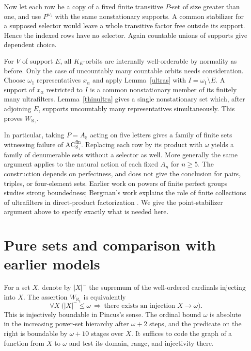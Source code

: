 \documentclass[11pt]{article}
\begin{document}
Now let each row be a copy of a fixed finite transitive $P$-set of size greater than one, and use $P^{\omega_1}$ with the same nonstationary supports. A common stabilizer for a supposed selector would leave a whole transitive factor free outside its support. Hence the indexed rows have no selector. Again countable unions of supports give dependent choice.

For $V$ of support $E$, all $K_E$-orbits are internally well-orderable by normality as before. Only the case of uncountably many countable orbits needs consideration. Choose $\omega_1$ representatives $x_\alpha$ and apply Lemma~\ref{ultras} with $I=\omega_1\setminus E$. A support of $x_\alpha$ restricted to $I$ is a common nonstationary member of its finitely many ultrafilters. Lemma~\ref{thinultra} gives a single nonstationary set which, after adjoining $E$, supports uncountably many representatives simultaneously. This proves $W_{\aleph_1}$.

In particular, taking $P=A_5$ acting on five letters gives a family of finite sets witnessing failure of $\mathrm{AC}_{\aleph_1}^{\mathrm{fin}}$. Replacing each row by its product with $\omega$ yields a family of denumerable sets without a selector as well. More generally the same argument applies to the natural action of each fixed $A_n$ for $n\ge5$. The construction depends on perfectness, and does not give the conclusion for pairs, triples, or four-element sets. Earlier work on powers of finite perfect groups studies strong boundedness; Bergman's work explains the role of finite collections of ultrafilters in direct-product factorization \cite{cornulier,bergman}. We give the point-stabilizer argument above to specify exactly what is needed here.
\section{Pure sets and comparison with earlier models}
For a set $X$, denote by $|X|^-$ the supremum of the well-ordered cardinals injecting into $X$. The assertion $W_{\aleph_1}$ is equivalently
\[
  \forall X\ \bigl(|X|^-\le\omega\ \Longrightarrow\
                   \text{there exists an injection } X\longrightarrow\omega\bigr).
\]
This is injectively boundable in Pincus's sense. The ordinal bound $\omega$ is absolute in the increasing power-set hierarchy after $\omega+2$ steps, and the predicate on the right is boundable by $\omega+10$ stages over $X$. It suffices to code the graph of a function from $X$ to $\omega$ and test its domain, range, and injectivity there.
\end{document}
